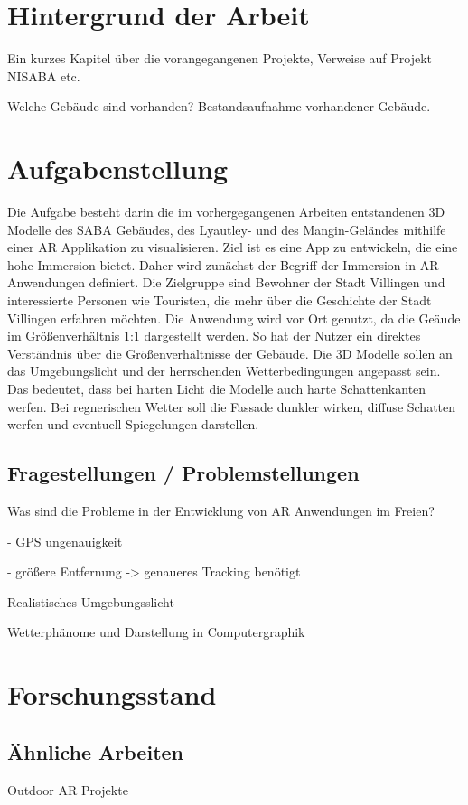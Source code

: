 \section{Hintergrund der Arbeit}
Ein kurzes Kapitel über die vorangegangenen Projekte, Verweise auf Projekt NISABA etc.

Welche Gebäude sind vorhanden? Bestandsaufnahme vorhandener Gebäude. 

\section{Aufgabenstellung}
Die Aufgabe besteht darin die im vorhergegangenen Arbeiten entstandenen 3D Modelle des SABA Gebäudes, des Lyautley- und des Mangin-Geländes mithilfe einer AR Applikation zu visualisieren. Ziel ist es eine App zu entwickeln, die eine hohe Immersion bietet. Daher wird zunächst der Begriff der Immersion in AR-Anwendungen definiert. Die Zielgruppe sind Bewohner der Stadt Villingen und interessierte Personen wie Touristen, die mehr über die Geschichte der Stadt Villingen erfahren möchten. Die Anwendung wird vor Ort genutzt, da die Geäude im Größenverhältnis 1:1 dargestellt werden. So hat der Nutzer ein direktes Verständnis über die Größenverhältnisse der Gebäude. Die 3D Modelle sollen an das Umgebungslicht und der herrschenden Wetterbedingungen angepasst sein. Das bedeutet, dass bei harten Licht die Modelle auch harte Schattenkanten werfen. Bei regnerischen Wetter soll die Fassade dunkler wirken, diffuse Schatten werfen und eventuell Spiegelungen darstellen.

\subsection{Fragestellungen / Problemstellungen}
Was sind die Probleme in der Entwicklung von AR Anwendungen im Freien?

- GPS ungenauigkeit

- größere Entfernung -> genaueres Tracking benötigt

Realistisches Umgebungsslicht

Wetterphänome und Darstellung in Computergraphik

\section{Forschungsstand}
\subsection{Ähnliche Arbeiten}
Outdoor AR Projekte

